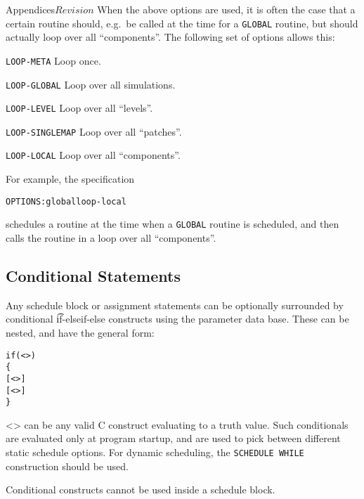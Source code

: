 \begin{cactuspart}{Appendices}{}{$Revision$}
When the above options are used, it is often the case that a certain
routine should, e.g.\ be called at the time for a \texttt{GLOBAL}
routine, but should actually loop over all ``components''.  The
following set of options allows this:

\begin{Lentry}
  
\item[{\tt LOOP-META}] Loop once.
  
\item[{\tt LOOP-GLOBAL}] Loop over all simulations.
  
\item[{\tt LOOP-LEVEL}] Loop over all ``levels''.
  
\item[{\tt LOOP-SINGLEMAP}] Loop over all ``patches''.
  
\item[{\tt LOOP-LOCAL}] Loop over all ``components''.

\end{Lentry}

For example, the specification
\begin{alltt}
  OPTIONS: global loop-local
\end{alltt}
schedules a routine at the time when a \texttt{GLOBAL} routine is
scheduled, and then calls the routine in a loop over all
``components''.


\subsection{Conditional Statements}

Any schedule block or assignment statements can be optionally
surrounded by conditional {\t if-elseif-else}
constructs using the parameter data base. These can be nested,
and have the general form:

\begin{alltt}
if (<>)
\{
  [<>]
  [<>]
\}\end{alltt}

<> can be any valid C construct evaluating
to a truth value.
Such conditionals are evaluated only at program startup, and are used
to pick between different static schedule options.  For dynamic
scheduling, the {\tt SCHEDULE WHILE} construction should be used.

Conditional constructs cannot be used inside a schedule block.


\end{cactuspart}
